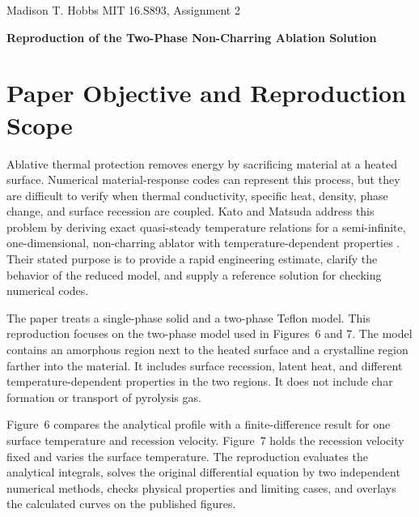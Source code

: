 \documentclass[11pt]{article}
\begin{document}
\noindent
{\small Madison T. Hobbs}
\hfill
{\small MIT 16.S893, Assignment 2}

\vspace{0.25em}

\begin{center}
    {\normalsize \textbf{Reproduction of the Two-Phase Non-Charring Ablation Solution}}
\end{center}

\vspace{0.35em}

\section{Paper Objective and Reproduction Scope}
Ablative thermal protection removes energy by sacrificing material at a heated
surface. Numerical material-response codes can represent this process, but
they are difficult to verify when thermal conductivity, specific heat,
density, phase change, and surface recession are coupled. Kato and Matsuda
address this problem by deriving exact quasi-steady temperature relations for
a semi-infinite, one-dimensional, non-charring ablator with
temperature-dependent properties \cite{kato2022}. Their stated purpose is to
provide a rapid engineering estimate, clarify the behavior of the reduced
model, and supply a reference solution for checking numerical codes.

The paper treats a single-phase solid and a two-phase Teflon model. This
reproduction focuses on the two-phase model used in Figures~6 and 7. The model
contains an amorphous region next to the heated surface and a crystalline
region farther into the material. It includes surface recession, latent heat,
and different temperature-dependent properties in the two regions. It does
not include char formation or transport of pyrolysis gas.

Figure~6 compares the analytical profile with a finite-difference result for
one surface temperature and recession velocity. Figure~7 holds the recession
velocity fixed and varies the surface temperature. The reproduction evaluates
the analytical integrals, solves the original differential equation by two
independent numerical methods, checks physical properties and limiting cases,
and overlays the calculated curves on the published figures.
\end{document}
